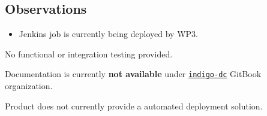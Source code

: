 \documentclass[a4wide,11pt]{article}
\begin{document}
 
 

\label{sec:unit_test}
\subsection{Observations}
\begin{itemize}
        \item Jenkins job is currently being deployed by WP3.
    \end{itemize}



\label{sec:func_int_test}

No functional or integration testing provided.




\label{sec:gitbook}
Documentation is currently \textbf{not available} under \href{https://www.gitbook.com/@indigo-dc/dashboard}{\texttt{indigo-dc}} GitBook organization.



\label{sec:configuration}


Product does not currently provide a automated deployment solution.



\newpage

\end{document}
